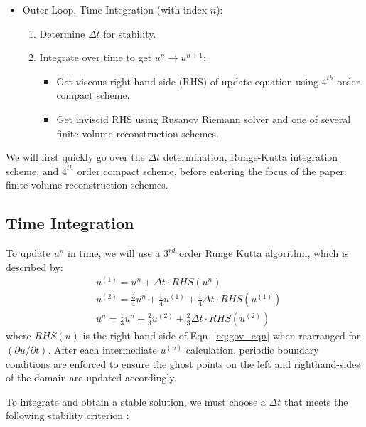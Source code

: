 \documentclass[conf]{new-aiaa}
\begin{document}
\begin{itemize}
	\item Outer Loop, Time Integration (with index $n$):
	\begin{enumerate}
		\item Determine $\Delta t$ for stability.
		\item Integrate over time to get $u^n \rightarrow u^{n+1}$:
		\begin{itemize}
			\item Get viscous right-hand side (RHS) of update equation using
				$4^{th}$ order compact scheme.
			\item Get inviscid RHS using Rusanov Riemann solver and one of
				several finite volume reconstruction schemes.
		\end{itemize}
	\end{enumerate}
\end{itemize}

We will first quickly go over the $\Delta t$ determination, Runge-Kutta
integration scheme, and $4^{th}$ order compact scheme, before entering the
focus of the paper: finite volume reconstruction schemes.

\subsection{Time Integration} \label{sec:time_int}
To update $u^n$ in time, we will use a $3^{rd}$ order Runge Kutta algorithm,
which is described by:
\begin{equation}
	\begin{aligned}
		& u^{(1)} = u^n + \Delta t \cdot \mathit{RHS}(u^n) \\
		& u^{(2)} = \frac{3}{4} u^n + \frac{1}{4} u^{(1)} +
		            \frac{1}{4} \Delta t \cdot \mathit{RHS}(u^{(1)}) \\
		& u^n     = \frac{1}{3} u^n + \frac{2}{3} u^{(2)} +
					\frac{2}{3} \Delta t \cdot \mathit{RHS}(u^{(2)})
	\end{aligned}
\end{equation}
where $RHS(u)$ is the right hand side of Eqn. \ref{eq:gov_eqn} when
rearranged for $(\partial u / \partial t)$. After each intermediate $u^{(n)}$
calculation, periodic boundary conditions are enforced to ensure the ghost
points on the left and righthand-sides of the domain are updated accordingly.

To integrate and obtain a stable solution, we must choose a $\Delta t$ that
meets the following stability criterion \cite{maulik2018explicit}:
\end{document}
